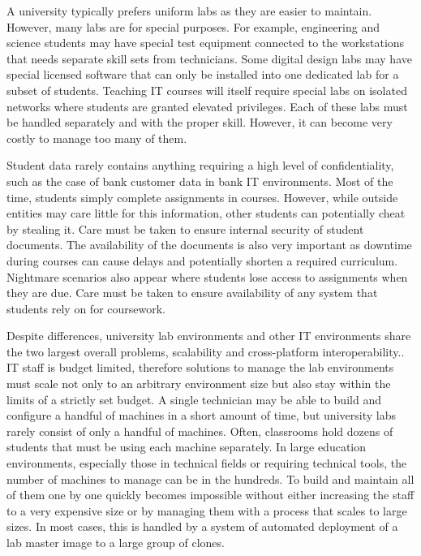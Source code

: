 A university typically prefers uniform labs as they are easier to maintain.  However, many labs are for special purposes.  For example, engineering and science students may have special test equipment connected to the workstations that needs separate skill sets from technicians.  Some digital design labs may have special licensed software that can only be installed into one dedicated lab for a subset of students.  Teaching IT courses will itself require special labs on isolated networks where students are granted elevated privileges.  Each of these labs must be handled separately and with the proper skill.  However, it can become very costly to manage too many of them. 

Student data rarely contains anything requiring a high level of confidentiality, such as the case of bank customer data in bank IT environments.  Most of the time, students simply complete assignments in courses.  However, while outside entities may care little for this information, other students can potentially cheat by stealing it.  Care must be taken to ensure internal security of student documents.  The availability of the documents is also very important as downtime during courses can cause delays and potentially shorten a required curriculum.  Nightmare scenarios also appear where students lose access to assignments when they are due.  Care must be taken to ensure availability of any system that students rely on for coursework. 

Despite differences, university lab environments and other IT environments share the two largest overall problems, scalability and cross-platform interoperability..  IT staff is budget limited, therefore solutions to manage the lab environments must scale not only to an arbitrary environment size but also stay within the limits of a strictly set budget.  A single technician may be able to build and configure a handful of machines in a short amount of time, but university labs rarely consist of only a handful of machines.  Often, classrooms hold dozens of students that must be using each machine separately.  In large education environments, especially those in technical fields or requiring technical tools, the number of machines to manage can be in the hundreds.  To build and maintain all of them one by one quickly becomes impossible without either increasing the staff to a very expensive size or by managing them with a process that scales to large sizes.  In most cases, this is handled by a system of automated deployment of a lab master image to a large group of clones. 


